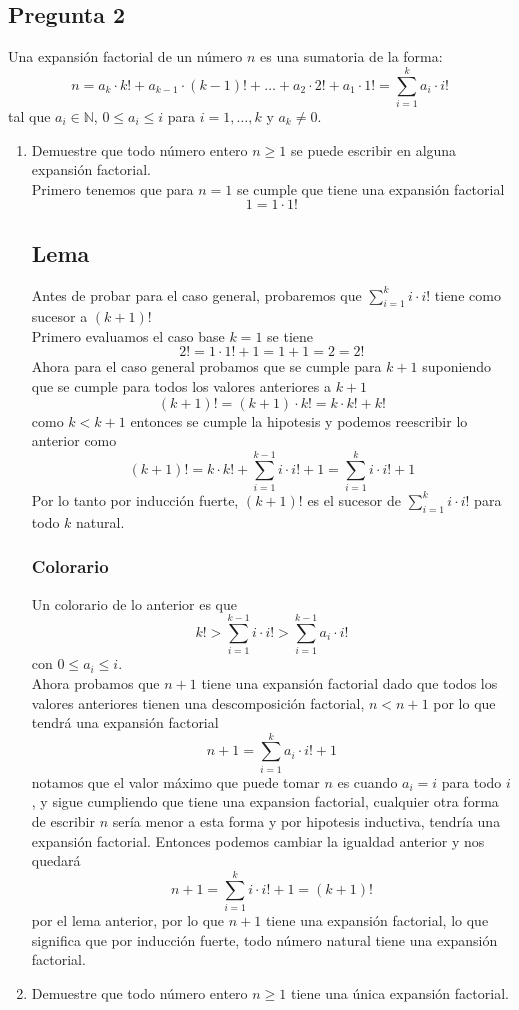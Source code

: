 \documentclass[letter]{article}
\begin{document}
	\begin{pregunta}{2}
		\section*{Pregunta 2}
		Una expansión factorial de un número $n$ es una sumatoria de la forma:
		$$ n = a_{k}\cdot k!+ a_{k-1}\cdot (k-1)!+\ldots + a_{2}\cdot 2!+a_{1}\cdot 1! = \sum_{i=1}^{k}a_{i}\cdot i!$$
		tal que $a_{i} \in \mathbb{N}$, $0\leq a_{i}\leq i$ para $i = 1, \ldots, k$ y $a_{k}\neq 0$.
		\begin{enumerate}
		\item Demuestre que todo número entero $n\geq 1$ se puede escribir en alguna expansión factorial.\\
		
		Primero tenemos que para $n=1$ se cumple que tiene una expansión factorial
		$$1 = 1\cdot 1!$$
		\subsection*{Lema}
		Antes de probar para el caso general, probaremos que $\sum_{i=1}^{k}i\cdot i!$ tiene como sucesor a $(k+1)!$\\
		
		Primero evaluamos el caso base $k=1$ se tiene
		$$2! = 1\cdot 1! + 1 = 1+1 = 2 = 2!$$
		Ahora para el caso general probamos que se cumple para $k+1$ suponiendo que se cumple para todos los valores anteriores a $k+1$
		$$(k+1)! = (k+1)\cdot k! = k\cdot k! + k!$$
		como $k< k+1$ entonces se cumple la hipotesis y podemos reescribir lo anterior como 
		$$ (k+1)!=k\cdot k! + \sum_{i=1}^{k-1}i\cdot i! + 1= \sum_{i=1}^{k}i\cdot i! + 1$$
		Por lo tanto por inducción fuerte, $(k+1)!$ es el sucesor de $\sum_{i=1}^{k}i\cdot i!$ para todo $k$ natural.\\
		\subsubsection*{Colorario}
		Un colorario de lo anterior es que 
		$$ k! > \sum_{i=1}^{k-1}i\cdot i! > \sum_{i=1}^{k-1}a_i\cdot i!$$
		con $0\leq a_i\leq i$.\\
		
		Ahora  probamos que $n+1$ tiene una expansión factorial dado que todos los valores anteriores tienen una descomposición factorial, $n < n +1$ por lo que tendrá una  expansión factorial
		$$ n + 1 = \sum_{i=1}^{k} a_{i}\cdot i! + 1$$
		notamos que el valor máximo que puede tomar $n$ es cuando $a_i = i$ para todo $i$, y sigue cumpliendo que tiene una expansion factorial, cualquier otra forma de escribir $n$ sería menor a esta forma y por hipotesis inductiva, tendría una expansión factorial. Entonces podemos cambiar la igualdad anterior y nos quedará
		$$ n+1 = \sum_{i=1}^{k}i\cdot i! + 1= (k+1)!$$
		por el lema anterior, por lo que $n+1$ tiene una expansión factorial, lo que significa que por inducción fuerte, todo número natural tiene una expansión factorial.
		\item Demuestre que todo número entero $n\geq 1$ tiene una única expansión factorial.\\
		

\end{enumerate}
\end{pregunta}
\end{document}

